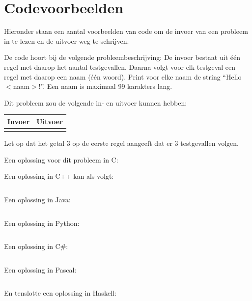 \newpage
\appendix

\section{Codevoorbeelden}\label{codeexamples}

Hieronder staan een aantal voorbeelden van code om de invoer van een
probleem in te lezen en de uitvoer weg te schrijven.

De code hoort bij de volgende probleembeschrijving:
De invoer bestaat uit \'e\'en regel met daarop het aantal testgevallen.
Daarna volgt voor elk testgeval een regel met daarop een naam (\'e\'en
woord). Print voor elke naam de string ``Hello $<$naam$>$!''. Een naam
is maximaal 99 karakters lang.

Dit probleem zou de volgende in- en uitvoer kunnen hebben:

\begin{tabular}{|p{}|p{}|}
\hline
\textbf{Invoer} & \textbf{Uitvoer} \\
\hline
 &
 \\
\hline
\end{tabular}

Let op dat het getal 3 op de eerste regel aangeeft dat er 3
testgevallen volgen.

Een oplossing voor dit probleem in C:

\newpage

Een oplossing in C++ kan als volgt:
\inputminted{cpp}{../examples/example.cc}

Een oplossing in Java:
\inputminted{java}{../examples/example.java}

Een oplossing in Python:
\inputminted{python}{../examples/example.py}

\newpage

Een oplossing in C\#:
\inputminted{csharp}{../examples/example.cs}

Een oplossing in Pascal:
\inputminted{pascal}{../examples/example.pas}

En tenslotte een oplossing in Haskell:
\inputminted{haskell}{../examples/example.hs}


